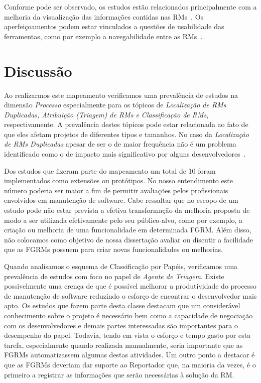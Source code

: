 Conforme pode ser observado, os estudos estão relacionados principalmente com a
melhoria da  visualização das informações contidas nas RMs~\cite{hora2012bug,
	takama2013application, dal2014bug}. Os aperfeiçoamentos podem estar
vinculados a questões de usabilidade das ferramentas, como por exemplo a
navegabilidade entre as RMs~\cite{dal2014bug}.

\section{Discussão}
\label{sec:discussao}

Ao realizarmos este mapeamento verificamos uma prevalência de estudos na
dimensão \textit{Processo} especialmente para os tópicos de \textit{Localização
    de RMs Duplicadas, Atribuição (Triagem) de RMs e Classificação de RMs},
respectivamente. A prevalência destes tópicos pode estar relacionada ao fato de
que eles afetam projetos de diferentes tipos e tamanhos. No caso da
\textit{Localização de RMs Duplicadas} apesar de ser o de maior frequência não é
um problema identificado como o de impacto mais significativo por alguns
desenvolvedores~\cite{Bettenburg2008a}.

Dos estudos que fizeram parte do mapeamento um total de 10 foram implementados
como extensões ou protótipos. No nosso entendimento este número poderia ser
maior a fim de permitir avaliações pelos profissionais envolvidos em manutenção
de software. Cabe ressaltar que no escopo de um estudo pode não estar prevista a
efetiva transformação da melhoria proposta de modo a ser utilizada efetivamente
pelo seu público-alvo, como por exemplo, a criação ou melhoria de uma
funcionalidade em determinada FGRM\@. Além disso, não colocamos como objetivo de
nossa dissertação avaliar ou discutir a facilidade que as FGRMs possuem para
criar novas funcionalidades ou melhorias.


Quando analisamos o esquema de Classificação por Papéis, verificamos uma
prevalência de estudos com foco no papel de \textit{Agente de Triagem}. Existe
possivelmente uma crença de que é possível melhorar a produtividade do processo
de manutenção de software reduzindo o esforço de encontrar o desenvolvedor mais
apto. Os estudos que fazem parte desta classe destacam que um considerável
conhecimento sobre o projeto é necessário bem como a capacidade de negociação
com os desenvolvedores e demais partes interessadas são importantes para o
desempenho do papel. Todavia, tendo em vista o esforço e tempo gasto por esta
tarefa, especialmente quando realizada ma\-nu\-al\-men\-te, seria importante que
as FGRMs automatizassem algumas destas atividades. Um outro ponto a destacar é
que as FGRMs deveriam dar suporte ao Reportador que, na maioria da vezes, é o
primeiro a registrar as informações que serão necessárias à solução da RM\@.

